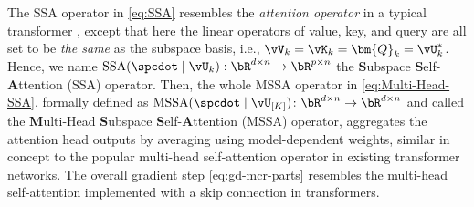 \documentclass[../../book-main.tex]{subfiles}
\begin{document}
\begin{remark}
    The SSA operator in \eqref{eq:SSA} resembles the
    \textit{attention operator} in a typical transformer
    \citep{vaswani2017attention}, except that here the linear
    operators of value, key, and query  are all set to be \textit{the
    same} as the subspace basis, i.e., $\vV_{k} = \vK_{k} =
    \bm{Q}_{k} = \vU_k^*$. Hence, we name
    $\mathrm{SSA}({\spcdot\mid\vU_k}): \bR^{d\times n} \rightarrow
    \bR^{p\times n}$  the \textbf{S}ubspace
    \textbf{S}elf-\textbf{A}ttention (SSA) operator. Then, the whole
    MSSA operator in \eqref{eq:Multi-Head-SSA}, formally defined as
    \(\mathrm{MSSA}({\spcdot \mid \vU_{[K]}}) \colon \bR^{d \times n}
    \to \bR^{d \times n}\) and called the \textbf{M}ulti-Head
    \textbf{S}ubspace \textbf{S}elf-\textbf{A}ttention (MSSA)
    operator, aggregates the attention head outputs by averaging
    using model-dependent weights, similar in concept to the popular
    multi-head self-attention operator in existing transformer
    networks.  The overall gradient step \eqref{eq:gd-mcr-parts}
    resembles the multi-head self-attention implemented with a skip
    connection in transformers.
\end{remark}
\end{document}
